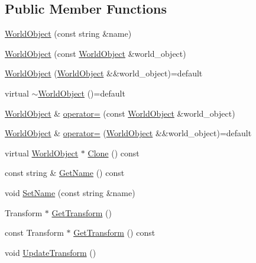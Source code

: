 \subsection*{Public Member Functions}
\begin{DoxyCompactItemize}
\item 
\hyperlink{classmage_1_1_world_object_a40d714ae9da1e197171c55f8fd321cc4}{World\+Object} (const string \&name)
\item 
\hyperlink{classmage_1_1_world_object_a4e7ace41518b45c75d975c766de28143}{World\+Object} (const \hyperlink{classmage_1_1_world_object}{World\+Object} \&world\+\_\+object)
\item 
\hyperlink{classmage_1_1_world_object_af8e2a82bd8a59d1ec8776e27ed5900cd}{World\+Object} (\hyperlink{classmage_1_1_world_object}{World\+Object} \&\&world\+\_\+object)=default
\item 
virtual \hyperlink{classmage_1_1_world_object_a6ae28ad98832c1e97b681816755a79f2}{$\sim$\+World\+Object} ()=default
\item 
\hyperlink{classmage_1_1_world_object}{World\+Object} \& \hyperlink{classmage_1_1_world_object_a0676dc2fde5791becae9547077c7db0c}{operator=} (const \hyperlink{classmage_1_1_world_object}{World\+Object} \&world\+\_\+object)
\item 
\hyperlink{classmage_1_1_world_object}{World\+Object} \& \hyperlink{classmage_1_1_world_object_a8dbb67991f149a2d4edbcd17ae4ec3ef}{operator=} (\hyperlink{classmage_1_1_world_object}{World\+Object} \&\&world\+\_\+object)=default
\item 
virtual \hyperlink{classmage_1_1_world_object}{World\+Object} $\ast$ \hyperlink{classmage_1_1_world_object_a8793d22cb63b1bd31b1307e5e7094f61}{Clone} () const
\item 
const string \& \hyperlink{classmage_1_1_world_object_a3aab270d50a8d9ab1f9a970d3e04245f}{Get\+Name} () const
\item 
void \hyperlink{classmage_1_1_world_object_aee42f65080a69ed5cfc681382328fe31}{Set\+Name} (const string \&name)
\item 
Transform $\ast$ \hyperlink{classmage_1_1_world_object_a4add48c19a884f5feaddc202c8266e9d}{Get\+Transform} ()
\item 
const Transform $\ast$ \hyperlink{classmage_1_1_world_object_a15517a1962c5eb33de5fd3da4b4afe12}{Get\+Transform} () const
\item 
void \hyperlink{classmage_1_1_world_object_a5ab5e580caa80d93a3c8b44d18ee2848}{Update\+Transform} ()
\end{DoxyCompactItemize}
